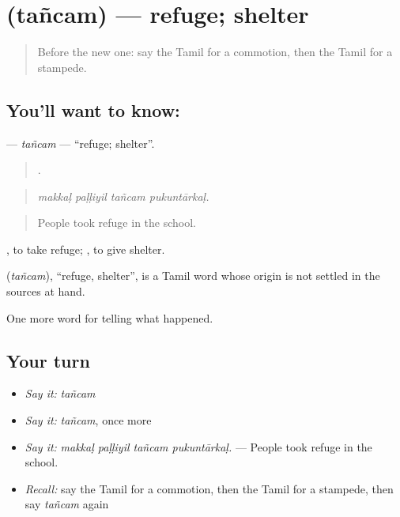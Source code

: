 \section[\texorpdfstring{\ta{தஞ்சம்} (tañcam)}{தஞ்சம் (tañcam)}]{ (tañcam) — refuge; shelter}

\label{lesson:TA-C303-tancam}



\begin{quote}
Before the new one: say the Tamil for a commotion, then the Tamil for a stampede.
\end{quote}

\subsection*{You'll want to know: }
\textbf{} — \emph{tañcam} — \textquotedblleft{}refuge; shelter\textquotedblright{}.

\begin{quote}
   .
\end{quote}

\begin{quote}
\emph{makkaḷ paḷḷiyil tañcam pukuntārkaḷ.}
\end{quote}

\begin{quote}
People took refuge in the school.
\end{quote}

 , to take refuge;  , to give shelter.

\begin{cousinweb}
\textbf{} (\emph{tañcam}), \textquotedblleft{}refuge, shelter\textquotedblright{}, is a Tamil word whose origin is not settled in the sources at hand.
\end{cousinweb}

\begin{grammarlens}[title={What you've built}]
One more word for telling what happened.
\end{grammarlens}

\subsection*{Your turn}
\begin{itemize}
\raggedright
  \item \emph{Say it:} \emph{tañcam}
  \item \emph{Say it:} \emph{tañcam}, once more
  \item \emph{Say it:} \emph{makkaḷ paḷḷiyil tañcam pukuntārkaḷ.} — People took refuge in the school.
  \item \emph{Recall:} say the Tamil for a commotion, then the Tamil for a stampede, then say \emph{tañcam} again
\end{itemize}

